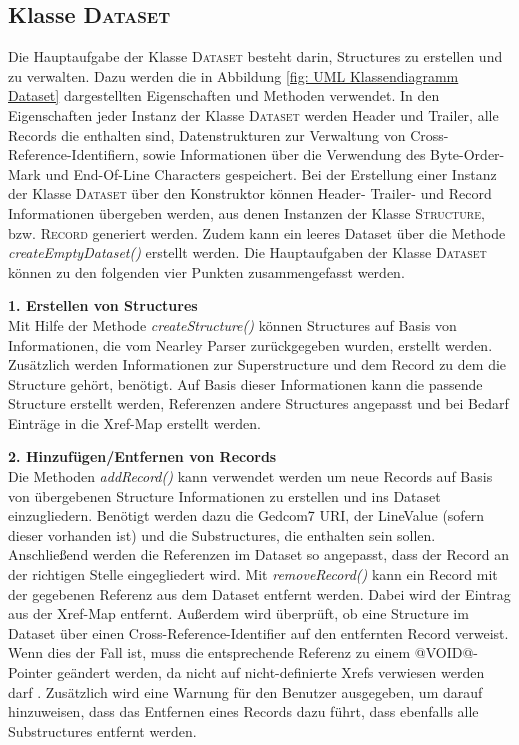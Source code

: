 \subsection{Klasse \textsc{Dataset}}
\label{subsec: Implementierung - Gedcom Struktur - Klasse Dataset}
Die Hauptaufgabe der Klasse \textsc{Dataset} besteht darin, Structures zu erstellen und zu verwalten. Dazu werden die in Abbildung \ref{fig: UML Klassendiagramm Dataset} dargestellten Eigenschaften und Methoden verwendet. In den Eigenschaften jeder Instanz der Klasse \textsc{Dataset} werden Header und Trailer, alle Records die enthalten sind, Datenstrukturen zur Verwaltung von Cross-Reference-Identifiern, sowie Informationen über die Verwendung des Byte-Order-Mark und End-Of-Line Characters gespeichert. Bei der Erstellung einer Instanz der Klasse \textsc{Dataset} über den Konstruktor können Header- Trailer- und Record Informationen übergeben werden, aus denen Instanzen der Klasse \textsc{Structure}, bzw. \textsc{Record} generiert werden. Zudem kann ein leeres Dataset über die Methode \textit{createEmptyDataset()} erstellt werden. Die Hauptaufgaben der Klasse \textsc{Dataset} können zu den folgenden vier Punkten zusammengefasst werden.

\vspace{1em}
\textbf{1. Erstellen von Structures} \vspace{0.5em} \\
Mit Hilfe der Methode \textit{createStructure()} können Structures auf Basis von Informationen, die vom Nearley Parser zurückgegeben wurden, erstellt werden. Zusätzlich werden Informationen zur Superstructure und dem Record zu dem die Structure gehört, benötigt. Auf Basis dieser Informationen kann die passende Structure erstellt werden, Referenzen andere Structures angepasst und bei Bedarf Einträge in die Xref-Map erstellt werden. 

\vspace{1em}
\textbf{2. Hinzufügen/Entfernen von Records} \vspace{0.5em} \\
Die Methoden \textit{addRecord()} kann verwendet werden um neue Records auf Basis von übergebenen Structure Informationen zu erstellen und ins Dataset einzugliedern. Benötigt werden dazu die Gedcom7 URI, der LineValue (sofern dieser vorhanden ist) und die Substructures, die enthalten sein sollen. Anschließend werden die Referenzen im Dataset so angepasst, dass der Record an der richtigen Stelle eingegliedert wird. Mit \textit{removeRecord()} kann ein Record mit der gegebenen Referenz aus dem Dataset entfernt werden. Dabei wird der Eintrag aus der Xref-Map entfernt. Außerdem wird überprüft, ob eine Structure im Dataset über einen Cross-Reference-Identifier auf den entfernten Record verweist. Wenn dies der Fall ist, muss die entsprechende Referenz zu einem @VOID@-Pointer geändert werden, da nicht auf nicht-definierte Xrefs verwiesen werden darf \cite{GEDCOM}. Zusätzlich wird eine Warnung für den Benutzer ausgegeben, um darauf hinzuweisen, dass das Entfernen eines Records dazu führt, dass ebenfalls alle Substructures entfernt werden. 


